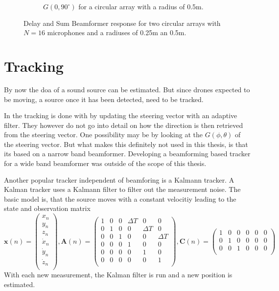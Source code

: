 \begin{figure}[h]
\begin{subfigure}[t]{0.45\textwidth}
		\caption{$G(0, 90^\circ)$ for a circular array with a radius of 0.5m.} 
		\label{ssl:fig:f_dep1}
	\end{subfigure}
	\caption{Delay and Sum Beamformer response for two circular arrays with $N=16$ microphones 
	and a radiuses of 0.25m an 0.5m. }
	\label{ssl:fig:f_deps}
\end{figure}
\section{Tracking}
By now the \acrshort{doa} of a sound source can be estimated.
But since drones expected to be moving, a source once it has been
detected, need to be tracked.

In \cite{GuiAhmad} the tracking is done with by 
updating the steering vector with an adaptive filter. 
They however do not go into detail on how the direction is then
retrieved from the steering vector.
One possibility may be by looking at the $G(\phi, \theta)$ of the steering vector.
But what makes this definitely not used in this thesis, is that its based on a 
narrow band beamformer. 
Developing a beamforming based tracker for a wide band beamformer was outside of the 
scope of this thesis.

Another popular tracker independent of beamforing is a Kalmann tracker.
A Kalman tracker uses a Kalmann filter to filter out the measurement noise.
The basic model is, that the source moves with a constant velocitiy leading to 
the state and observation matrix
\begin{equation*}
	\bm{x}(n) = 
	\begin{pmatrix}
		x_n \\
		y_n \\
		z_n \\
		\dot{x}_n \\
		\dot{y}_n \\
		\dot{z}_n \\
	\end{pmatrix},
	\bm{A}(n) = 
	\begin{pmatrix}
		1 & 0 & 0 & \Delta T & 0 & 0\\
		0 & 1 & 0 & 0 & \Delta T  & 0\\
		0 & 0 & 1 & 0 & 0 & \Delta T \\
		0 & 0 & 0 & 1 & 0 & 0\\
		0 & 0 & 0 & 0 & 1 & 0\\
		0 & 0 & 0 & 0 & 0 & 1\\		
	\end{pmatrix}, 
	\bm{C}(n) = 
	\begin{pmatrix}
		1 & 0 & 0 & 0 & 0 & 0\\
		0 & 1 & 0 & 0 & 0 & 0\\
		0 & 0 & 1 & 0 & 0 & 0 \\	
	\end{pmatrix}
\end{equation*}
With each new measurement, the Kalman filter is run and a new position is 
estimated.

